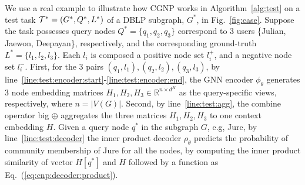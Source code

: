 \begin{example}
We use a real example to illustrate how CGNP works in
Algorithm~\ref{alg:test} on a test task $\mathcal{T}^*= (G^*, Q^*, L^*)$ of
a DBLP subgraph, $G^*$, in Fig.~\ref{fig:case}. Suppose the task
possesses query nodes $Q^* =\{q_1, q_2, q_3\}$ correspond to 3 users
\{Julian, Jaewon, Deepayan\}, respectively, and the corresponding
ground-truth $L^* =\{ l_1, l_2, l_3\}$.  Each $l_i$ is composed a
positive node set $l_i^+$, and a negative node set $l_i^-$.  First,
for the 3 pairs $(q_1, l_1), (q_2, l_2), (q_3, l_3)$, by
line~\ref{line:test:encoder:start}-\ref{line:test:encoder:end}, the
GNN encoder $\phi_{\theta}$ generates 3 node embedding matrices $H_1,
H_2, H_3 \in \mathbb{R}^{n \times d^K}$ as the query-specific views,
respectively, where $n = |V(G)|$.  Second, by
line~\ref{line:test:agg}, the combine operator big $\oplus$ aggregates
the three matrices $H_1, H_2, H_3$ to one context embedding $H$.
Given a query node $q^*$ in the subgraph $G$, e.g, Jure, by
line~\ref{line:test:decoder} the inner product decoder $\rho_{\theta}$
predicts the probability of community membership of Jure for all the
nodes, by computing the inner product similarity of vector $H[q^*]$
and $H$ followed by a  function as
Eq.~(\ref{eq:cnp:decoder:product}).
\end{example}


